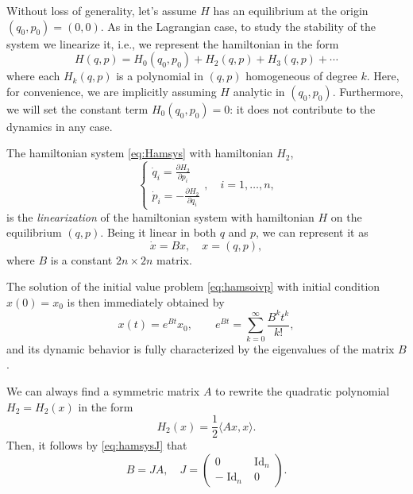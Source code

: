 \documentclass[english,fontsize=11pt,paper=b5]{scrbook}
\DeclareMathOperator{\Id}{Id}
\DeclareMathOperator{\Id}{Id}
\theoremstyle{definition}
\begin{document}
      Without loss of generality, let's assume $H$ has an equilibrium at the origin $(q_0, p_0) = (0,0)$.
      As in the Lagrangian case, to study the stability of the system we linearize it, i.e., we represent the hamiltonian in the form
      \begin{equation}\label{eq:hamidevl}
        H(q,p) = H_0(q_0,p_0) + H_2(q,p) + H_3(q,p) + \cdots
      \end{equation}
      where each $H_k(q,p)$ is a polynomial in $(q,p)$ homogeneous of degree $k$.
      Here, for convenience, we are implicitly assuming $H$ analytic in $(q_0,p_0)$.
      Furthermore, we will set the constant term $H_0(q_0,p_0) = 0$: it does not contribute to the dynamics in any case.

      The hamiltonian system \eqref{eq:Hamsys} with hamiltonian $H_2$,
      \begin{equation}\label{eq:lienarizedH}
        \left\lbrace
          \begin{aligned}
            \dot q_i = \frac{\partial H_2}{\partial p_i} \\
            \dot p_i = -\frac{\partial H_2}{\partial q_i}
          \end{aligned}
        \right .,\quad i=1,\ldots,n,
      \end{equation}
      is the \emph{linearization} of the hamiltonian system with hamiltonian $H$ on the equilibrium $(q,p)$.
      Being it linear in both $q$ and $p$, we can represent it as
      \begin{equation}\label{eq:hamsoivp}
        \dot x = B x,\quad x =(q,p),
      \end{equation}
      where $B$ is a constant $2n\times2n$ matrix.

      The solution of the initial value problem \eqref{eq:hamsoivp} with initial condition $x(0) = x_0$ is then immediately obtained by
      \begin{equation}
        x(t) = e^{Bt} x_0, \qquad e^{Bt} = \sum_{k=0}^\infty \frac{B^k t^k}{k!},
      \end{equation}
      and its dynamic behavior is fully characterized by the eigenvalues of the matrix $B$.

      We can always find a symmetric matrix $A$ to rewrite the quadratic polynomial $H_2 = H_2(x)$ in the form
      \begin{equation}
        H_2(x) = \frac12 \langle Ax, x\rangle.
      \end{equation}
      Then, it follows by \eqref{eq:hamsysJ} that
      \begin{equation}
        B = J A, \quad J = \begin{pmatrix}
          0 & \Id_n \\-\Id_n&0
        \end{pmatrix}.
      \end{equation}
\end{document}
